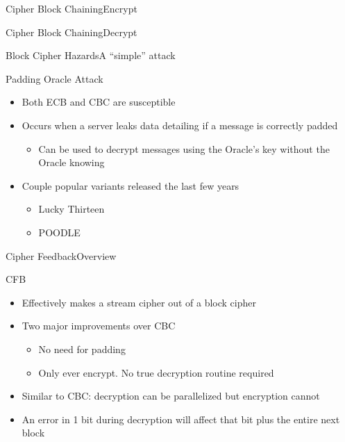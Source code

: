 \documentclass[12pt]{beamer}
\begin{document}
\begin{frame}{Cipher Block Chaining}{Encrypt}
\begin{center}
\end{center}
\end{frame}

\begin{frame}{Cipher Block Chaining}{Decrypt}
\begin{center}
\end{center}
\end{frame}

\begin{frame}{Block Cipher Hazards}{A ``simple'' attack}
\begin{block}{Padding Oracle Attack}
\begin{itemize}
	\item Both ECB and CBC are susceptible
	\item Occurs when a server leaks data detailing if a message is correctly padded
	\begin{itemize}
		\item Can be used to decrypt messages using the Oracle's key without the Oracle knowing
	\end{itemize}
	\item Couple popular variants released the last few years
	\begin{itemize}
		\item Lucky Thirteen
		\item POODLE
	\end{itemize}
\end{itemize}
\end{block}
\end{frame}

\begin{frame}{Cipher Feedback}{Overview}
\begin{block}{CFB}
\begin{itemize}
	\item Effectively makes a stream cipher out of a block cipher
	\item Two major improvements over CBC
	\begin{itemize}
		\item No need for padding
		\item Only ever encrypt. No true decryption routine required
	\end{itemize}
	\item Similar to CBC: decryption can be parallelized but encryption cannot
	\item An error in 1 bit during decryption will affect that bit plus the entire next block
\end{itemize}
\end{block}
\end{frame}
\end{document}
